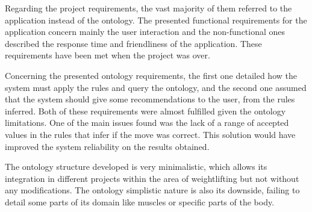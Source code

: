 Regarding the project requirements, the vast majority of them referred to the application instead of the ontology. The presented functional requirements for the application concern mainly the user interaction and the non-functional ones described the response time and friendliness of the application. These requirements have been met when the project was over.

Concerning the presented ontology requirements, the first one detailed how the system must apply the rules and query the ontology, and the second one assumed that the system should give some recommendations to the user, from the rules inferred. Both of these requirements were almost fulfilled given the ontology limitations. One of the main issues found was the lack of a range of accepted values in the rules that infer if the move was correct. This solution would have improved the system reliability on the results obtained.

The ontology structure developed is very minimalistic, which allows its integration in different projects within the area of weightlifting but not without any modifications. The ontology simplistic nature is also its downside, failing to detail some parts of its domain like muscles or specific parts of the body.